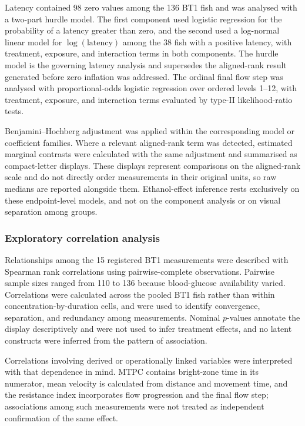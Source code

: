 \documentclass[12pt,a4paper]{article}
\begin{document}
Latency contained 98 zero values among the 136 BT1 fish and was analysed with a two-part hurdle model. The first component used logistic regression for the probability of a latency greater than zero, and the second used a log-normal linear model for $\log(\mathrm{latency})$ among the 38 fish with a positive latency, with treatment, exposure, and interaction terms in both components. The hurdle model is the governing latency analysis and supersedes the aligned-rank result generated before zero inflation was addressed. The ordinal final flow step was analysed with proportional-odds logistic regression over ordered levels 1--12, with treatment, exposure, and interaction terms evaluated by type-II likelihood-ratio tests.

Benjamini--Hochberg adjustment was applied within the corresponding model or coefficient families. Where a relevant aligned-rank term was detected, estimated marginal contrasts were calculated with the same adjustment and summarised as compact-letter displays. These displays represent comparisons on the aligned-rank scale and do not directly order measurements in their original units, so raw medians are reported alongside them. Ethanol-effect inference rests exclusively on these endpoint-level models, and not on the component analysis or on visual separation among groups.

\subsubsection{Exploratory correlation analysis}
\label{sec:correlations}
Relationships among the 15 registered BT1 measurements were described with Spearman rank correlations using pairwise-complete observations. Pairwise sample sizes ranged from 110 to 136 because blood-glucose availability varied. Correlations were calculated across the pooled BT1 fish rather than within concentration-by-duration cells, and were used to identify convergence, separation, and redundancy among measurements. Nominal $p$-values annotate the display descriptively and were not used to infer treatment effects, and no latent constructs were inferred from the pattern of association.

Correlations involving derived or operationally linked variables were interpreted with that dependence in mind. MTPC contains bright-zone time in its numerator, mean velocity is calculated from distance and movement time, and the resistance index incorporates flow progression and the final flow step; associations among such measurements were not treated as independent confirmation of the same effect.
\end{document}
